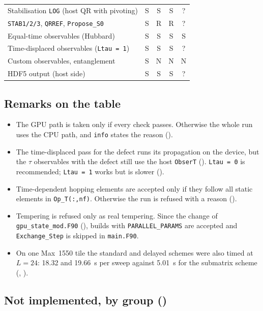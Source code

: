 \begin{table}[h]
\begin{tabular}{@{}p{6.1cm}cccc@{}}
Stabilisation \texttt{LOG} (host QR with pivoting) & S & S & S & ? \\ %
\texttt{STAB1/2/3}, \texttt{QRREF}, \texttt{Propose\_S0} & S & R & R & ? \\ %
Equal-time observables (Hubbard) & S & S & S & S \\ %
Time-displaced observables (\texttt{Ltau = 1}) & S & S & S & ? \\ %
Custom observables, entanglement & S & N & N & N \\ %
HDF5 output (host side) & S & S & S & ? \\ %
\bottomrule
\end{tabular}
\end{table}

\subsection*{Remarks on the table}

\begin{itemize}
\item The GPU path is taken only if every check passes. Otherwise the whole run uses the CPU path, and \texttt{info} states the reason ().
\item The time-displaced pass for the defect runs its propagation on the device, but the $\tau$ observables with the defect still use the host \texttt{ObserT} (). \texttt{Ltau = 0} is recommended; \texttt{Ltau = 1} works but is slower ().
\item Time-dependent hopping elements are accepted only if they follow all static elements in \texttt{Op\_T(:,nf)}. Otherwise the run is refused with a reason ().
\item Tempering is refused only as real tempering. Since the change of \texttt{gpu\_state\_mod.F90} (), builds with \texttt{PARALLEL\_PARAMS} are accepted and \texttt{Exchange\_Step} is skipped in \texttt{main.F90}.
\item On one Max~1550 tile the standard and delayed schemes were also timed at $L=24$: 18.32 and 19.66~s per sweep against 5.01~s for the submatrix scheme (, ).
\end{itemize}

\subsection*{Not implemented, by group ()}

